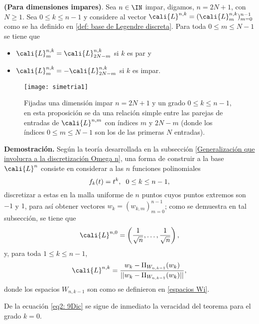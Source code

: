 \begin{teo}
\label{prop: simetrias en dimensiones impares}
\textbf{(Para dimensiones impares)}. Sea $n \in \IN$ impar, digamos,
$n=2N+1$, con $N \geq 1$. Sea $0 \leq k \leq n-1$ y
considere al vector $\cali{L}^{n,k}=(\cali{L}^{n,k}_{m})_{m=0}^{n-1}$
como se ha definido en \eqref{def: base de Legendre discreta}.
Para toda $0 \leq m \leq N-1$ se tiene que
\begin{itemize}
\item $\cali{L}^{n,k}_{m} = \cali{L}^{n,k}_{2N-m}$ si $k$ es par y
\item $\cali{L}^{n,k}_{m} = -\cali{L}^{n,k}_{2N-m}$ si $k$ es impar.
\end{itemize}


\begin{figure}[H]
\centering\captionsetup{format = hang}
	\begin{measuredfigure}
		\texttt{[image: simetria1]} 
		\caption{Fijadas una dimensión impar $n=2N+1$ 
		y un grado $0 \leq k \leq n-1$,
		en esta proposición se da una relación simple entre las parejas 
		de entradas de $\cali{L}^{n,m}$ con índices $m$ y $2N-m$ 
		(donde los índices $0 \leq m \leq N-1$ son los de las primeras
		$N$ entradas).}
 	\end{measuredfigure}
 \end{figure}
\end{teo}
\noindent
\textbf{Demostración.}
Según la teoría desarrollada en la subsección
\ref{Generalización que involucra a la discretización Omega n},
una forma de construir a 
la base $\cali{L}^{n}$ consiste en 
considerar a las $n$ funciones polinomiales
\[
f_{k}(t)= t^{k}, \hspace{0.2cm} 0 \leq k\leq n-1,
\]
discretizar a estas en la malla uniforme de $n$ puntos
cuyos puntos extremos son $-1$ y $1$, para así obtener
vectores $w_{k}=(w_{k,m})_{m=0}^{n-1}$; como se 
demuestra en tal subsección, se tiene que
\begin{equation} 
\label{eq2: 9Dic}
\cali{L}^{n,0}= 
\left( \frac{1}{\sqrt{n}}, \ldots , \frac{1}{\sqrt{n}} \right),
\end{equation}
y, para toda $1 \leq k \leq n-1$,
\begin{equation} 
\label{eq1: 9Dic}
\cali{L}^{n,k}= 
\frac{w_{k}- \Pi_{W_{n,k-1}}(w_{k})}{|| w_{k}- \Pi_{W_{n,k-1}}(w_{k}) ||},
\end{equation}
donde los espacios $W_{n,k-1}$ son como 
se definieron en \eqref{espacios Wi}.


De la ecuación \eqref{eq2: 9Dic} se sigue de inmediato
la veracidad del teorema
para el grado $k=0$.

